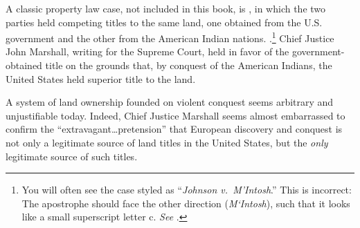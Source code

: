
A classic property law case,
not included in this book, is , in which the two
parties held competing titles to the same land, one obtained from the U.S.
government and the other from the American Indian nations.
.\footnote{You will often see the case styled as
``\emph{Johnson v.~M'Intosh}.'' This is incorrect: The apostrophe should face
the other direction (\emph{M`Intosh}), such that it looks like a small
superscript letter c. \emph{See} .}
Chief Justice John Marshall, writing for the Supreme Court, held in favor of the
government-obtained title on the grounds that, by conquest of the American
Indians, the United States held superior title to the land.

A system of land ownership founded on violent conquest seems arbitrary and
unjustifiable today. Indeed, Chief Justice Marshall seems almost embarrassed to
confirm the ``extravagant\ldots pretension'' that European discovery and
conquest is not only a legitimate source of land titles in the United States,
but the \textit{only} legitimate source of such titles.

